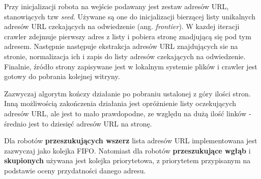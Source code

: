 Przy inicjalizacji robota na wejście podawany jest zestaw adresów URL, stanowiących tzw \emph{seed}. Używane są one do inicjalizacji bierzącej listy unikalnych adresów URL czekających na odwiedzenie (ang. \emph{frontier}). W kazdej iteracji crawler zdejmuje pierwszy adres z listy i pobiera stronę znadjującą 
się pod tym adresem. Następnie następuje ekstrakcja adresów URL znajdujących sie na stronie, normalizacja ich i zapis do listy adresów czekających na odwiedzenie. Finalnie, źródło strony zapisywane jest w lokalnym systemie plików i crawler jest gotowy do pobrania kolejnej witryny.

Zazwyczaj algorytm kończy działanie po pobraniu ustalonej z góry ilości stron. Inną możliwością zakończenia działania jest opróżnienie listy oczekujących adresów URL, ale jest to mało prawdopodne, ze względu na dużą ilość linków - średnio jest to dziesięć adresów URL na stronę\cite[s.312]{webMining}.

Dla robotów \textbf{przeszukujących wszerz} lista adresów URL implementowana jest zazwyczaj jako kolejka FIFO. Natomiast dla  robotów \textbf{przeszukujące wgłąb}
i \textbf{skupionych} używana jest kolejka priorytetowa, z priorytetem przypisanym na podstawie oceny przydatności danego adresu.


